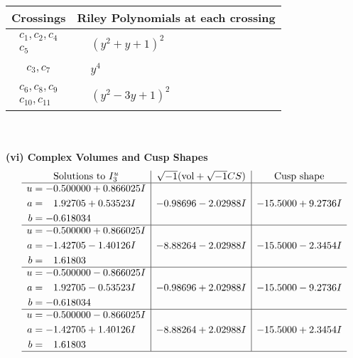 \documentclass[1p]{elsarticle_modified}
\theoremstyle{definition}
\newcommand{\I}{\sqrt{-1}}
\begin{document}
\begin{tabular}{m{50pt}|m{274pt}}
Crossings & \hspace{64pt}Riley Polynomials at each crossing \\
\hline $$\begin{aligned}c_{1},c_{2},c_{4}\\c_{5}\end{aligned}$$&$\begin{aligned}
&(y^2+y+1)^2
\end{aligned}$\\
\hline $$\begin{aligned}c_{3},c_{7}\end{aligned}$$&$\begin{aligned}
&y^4
\end{aligned}$\\
\hline $$\begin{aligned}c_{6},c_{8},c_{9}\\c_{10},c_{11}\end{aligned}$$&$\begin{aligned}
&(y^2-3 y+1)^2
\end{aligned}$\\
\hline
\end{tabular}\\~\\
\newpage\flushleft \textbf{(vi) Complex Volumes and Cusp Shapes}
$$\begin{array}{c|c|c}  
\text{Solutions to }I^u_{3}& \I (\text{vol} + \sqrt{-1}CS) & \text{Cusp shape}\\
 \hline 
\begin{aligned}
u &= -0.500000 + 0.866025 I \\
a &= \phantom{-}1.92705 + 0.53523 I \\
b &= -0.618034\phantom{ +0.000000I}\end{aligned}
 & -0.98696 - 2.02988 I & -15.5000 + 9.2736 I \\ \hline\begin{aligned}
u &= -0.500000 + 0.866025 I \\
a &= -1.42705 - 1.40126 I \\
b &= \phantom{-}1.61803\phantom{ +0.000000I}\end{aligned}
 & -8.88264 - 2.02988 I & -15.5000 - 2.3454 I \\ \hline\begin{aligned}
u &= -0.500000 - 0.866025 I \\
a &= \phantom{-}1.92705 - 0.53523 I \\
b &= -0.618034\phantom{ +0.000000I}\end{aligned}
 & -0.98696 + 2.02988 I & -15.5000 - 9.2736 I \\ \hline\begin{aligned}
u &= -0.500000 - 0.866025 I \\
a &= -1.42705 + 1.40126 I \\
b &= \phantom{-}1.61803\phantom{ +0.000000I}\end{aligned}
 & -8.88264 + 2.02988 I & -15.5000 + 2.3454 I\\
 \hline 
 \end{array}$$\newpage
\end{document}
